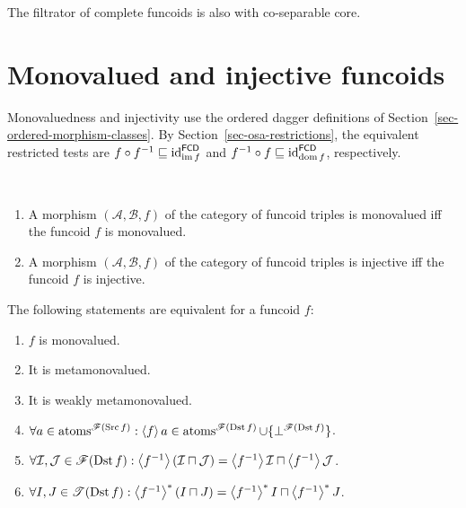 \begin{cor}
The filtrator of complete funcoids is also with co-separable core.
\end{cor}

\section{Monovalued and injective funcoids}

Monovaluedness and injectivity use the ordered dagger definitions
of Section~\ref{sec-ordered-morphism-classes}. By
Section~\ref{sec-osa-restrictions}, the equivalent restricted tests are
$f\circ f^{-1}\sqsubseteq{\operatorname{id}}_{\operatorname{im} f}^{\mathsf{FCD}}$ and
$f^{-1}\circ f\sqsubseteq{\operatorname{id}}_{\operatorname{dom} f}^{\mathsf{FCD}}$, respectively.

\begin{obvious}
~
\begin{enumerate}
\item A morphism $(\mathcal{A},\mathcal{B},f)$ of the category of funcoid
triples is monovalued iff the funcoid $f$ is monovalued.
\item A morphism $(\mathcal{A},\mathcal{B},f)$ of the category of funcoid
triples is injective iff the funcoid $f$ is injective.
\end{enumerate}
\end{obvious}
\begin{thm}
The following statements are equivalent for a funcoid $f$:
\begin{enumerate}
\item \label{fcd-mv}$f$ is monovalued.
\item \label{fcd-mmv}It is metamonovalued.
\item \label{fcd-wmmv}It is weakly metamonovalued.
\item \label{mnv-atom}$\forall a\in\operatorname{atoms}^{\mathscr{F}(\operatorname{Src} f)}:\left\langle f\right\rangle a\in\operatorname{atoms}^{\mathscr{F}(\operatorname{Dst} f)}\cup\{\bot^{\mathscr{F}(\operatorname{Dst} f)}\}$.
\item \label{mnv-flt}$\forall\mathcal{I},\mathcal{J}\in\mathscr{F}(\operatorname{Dst}
f):\left\langle f^{-1}\right\rangle(\mathcal{I}\sqcap\mathcal{J})=\left\langle f^{-1}\right\rangle\mathcal{I}
\sqcap\left\langle f^{-1}\right\rangle\mathcal{J}$.
\item \label{mnv-set}$\forall I,J\in\mathscr{T}(\operatorname{Dst} f):\left\langle f^{-1}\right\rangle ^{\ast}(I\sqcap
J)=\left\langle f^{-1}\right\rangle ^{\ast}I\sqcap\left\langle f^{-1}\right\rangle ^{\ast}J$.
\end{enumerate}
\end{thm}
